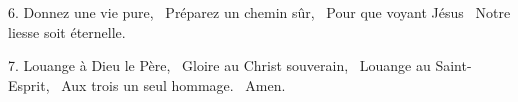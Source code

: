 {6. Donnez une vie pure,~\newline
Préparez un chemin sûr,~\newline
Pour que voyant Jésus~\newline
Notre liesse soit éternelle.}

{7. Louange à Dieu le Père,~\newline
Gloire au Christ souverain,~\newline
Louange au Saint-Esprit,~\newline
Aux trois un seul hommage.~\newline
Amen.}
